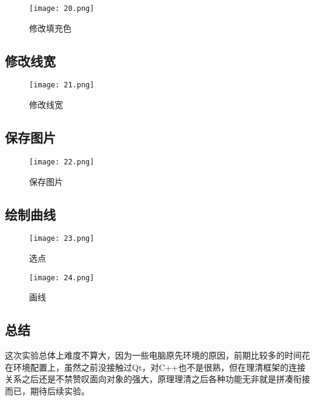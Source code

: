 \documentclass[14pt]{scrartcl} %
\begin{document}
\begin{figure}[h] %
	\centering
	\texttt{[image: 20.png]} %
	\caption{修改填充色}
\end{figure}

\pagebreak
\subsection{修改线宽}

\begin{figure}[h] %
	\centering
	\texttt{[image: 21.png]} %
	\caption{修改线宽}
\end{figure}

\subsection{保存图片}

\begin{figure}[h] %
	\centering
	\texttt{[image: 22.png]} %
	\caption{保存图片}
\end{figure}

\pagebreak

\subsection{绘制曲线}

\begin{figure}[h] %
	\begin{minipage}[t]{0.5\linewidth}
		\centering
		\texttt{[image: 23.png]}
		\caption{选点}
	\end{minipage}%
	\begin{minipage}[t]{0.5\linewidth}
		\centering
		\texttt{[image: 24.png]}
		\caption{画线}
	\end{minipage}
\end{figure}

\subsection{总结}

这次实验总体上难度不算大，因为一些电脑原先环境的原因，前期比较多的时间花在环境配置上，虽然之前没接触过Qt，对C++也不是很熟，但在理清框架的连接关系之后还是不禁赞叹面向对象的强大，原理理清之后各种功能无非就是拼凑衔接而已，期待后续实验。
\end{document}
